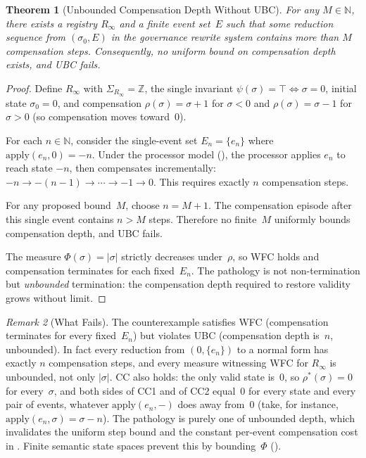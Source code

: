 \documentclass[11pt,a4paper]{article}
\theoremstyle{plain}
\newtheorem{theorem}{Theorem}[section]
\theoremstyle{definition}
\theoremstyle{remark}
\newtheorem{remark}[theorem]{Remark}
\begin{document}
\begin{theorem}[Unbounded Compensation Depth Without UBC]
\label{thm:necessity}
For any $M \in \mathbb{N}$, there exists a registry $R_\infty$ and a finite
event set~$E$ such that some reduction sequence from $(\sigma_0, E)$ in the
governance rewrite system contains more than $M$ compensation steps.
Consequently, no uniform bound on compensation depth exists, and UBC fails.
\end{theorem}

\begin{proof}
Define $R_\infty$ with $\Sigma_{R_\infty} = \mathbb{Z}$, the single invariant
$\psi(\sigma) = \top \iff \sigma = 0$, initial state $\sigma_0 = 0$, and
compensation $\rho(\sigma) = \sigma + 1$ for $\sigma < 0$ and
$\rho(\sigma) = \sigma - 1$ for $\sigma > 0$ (so compensation moves
toward~$0$).

For each $n \in \mathbb{N}$, consider the single-event set $E_n = \{e_n\}$
where $\mathrm{apply}(e_n, 0) = -n$.  Under the processor model
(), the processor applies $e_n$ to reach state $-n$, then
compensates incrementally: $-n \to -(n-1) \to \cdots \to -1 \to 0$.  This
requires exactly $n$ compensation steps.

For any proposed bound~$M$, choose $n = M + 1$.  The compensation episode
after this single event contains $n > M$ steps.  Therefore no finite~$M$
uniformly bounds compensation depth, and UBC fails.

The measure $\Phi(\sigma) = |\sigma|$ strictly decreases under~$\rho$, so WFC
holds and compensation terminates for each fixed~$E_n$.  The pathology is not
non-termination but \emph{unbounded} termination: the compensation depth
required to restore validity grows without limit.
\end{proof}

\begin{remark}[What Fails]
The counterexample satisfies WFC (compensation terminates for every
fixed~$E_n$) but violates UBC (compensation depth is~$n$, unbounded).  In
fact every reduction from $(0, \{e_n\})$ to a normal form has exactly $n$
compensation steps, and every measure witnessing WFC for $R_\infty$ is
unbounded, not only $|\sigma|$.  CC also holds: the only valid state is~$0$,
so $\rho^*(\sigma) = 0$ for every~$\sigma$, and both sides of CC1 and of CC2
equal~$0$ for every state and every pair of events, whatever
$\mathrm{apply}(e_n, -)$ does away from~$0$ (take, for instance,
$\mathrm{apply}(e_n, \sigma) = \sigma - n$).  The pathology is purely one of
unbounded depth, which invalidates the uniform step bound and the constant
per-event compensation cost in .  Finite semantic state
spaces prevent this by bounding~$\Phi$ ().
\end{remark}
\end{document}
